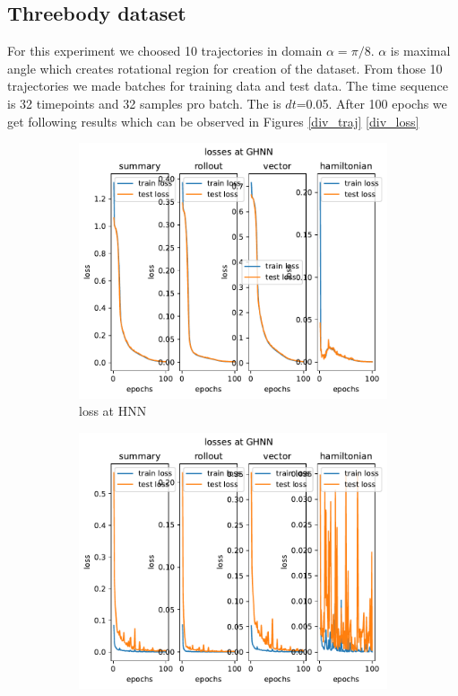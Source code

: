 \subsection{Threebody dataset}
For this experiment we choosed 10 trajectories in domain $\alpha= \pi/8$. $\alpha$
is maximal angle which creates rotational region for creation of the dataset. From those 10 trajectories we made batches for training data and test data. The time sequence is 32 timepoints and 32 samples pro batch. The is $dt$=0.05.
After 100 epochs we get following results which can be observed in Figures \ref{div_traj} \ref{div_loss}
\begin{figure}[H]
	\centering
	\begin{subfigure}[b]{0.3\textwidth}
		\centering
		\includegraphics[width=\textwidth]{chapters/chapter5/figonly_hnn_loss.pdf}
		\caption{loss at HNN}
		\label{fig:image1}
	\end{subfigure}
	\hfill
	\begin{subfigure}[b]{0.3\textwidth}
		\centering
		\includegraphics[width=\textwidth]{chapters/chapter5/figonly_ghnn_loss.pdf}

\end{subfigure}
\end{figure}
